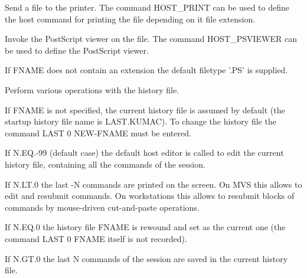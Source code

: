 \ENDCMD


\BEGARG
{}
\ENDARG

   \par
Send a file to the printer.  The command HOST\_PRINT can be used to define 
   the host command for printing the file depending on it file extension.  

\ENDCMD


\BEGARG
{}
\ENDARG

   \par
Invoke the PostScript viewer on the file.  The command HOST\_PSVIEWER can 
   be used to define the PostScript viewer.  

   \par
If FNAME does not contain an extension the default filetype '.PS' is 
   supplied.  

\ENDCMD


\BEGARG
{}
\ENDARG

   \par
Perform various operations with the history file.  

   \par
If FNAME is not specified, the current history file is assumed by default 
   (the startup history file name is LAST.KUMAC).  To change the history file 
   the command LAST 0 NEW-FNAME must be entered.  

   \par
If N.EQ.-99 (default case) the default host editor is called to edit the 
   current history file, containing all the commands of the session.  

   \par
If N.LT.0 the last -N commands are printed on the screen.  On MVS this 
   allows to edit and resubmit commands.  On workstations this allows to 
   resubmit blocks of commands by mouse-driven cut-and-paste operations.  

   \par
If N.EQ.0 the history file FNAME is rewound and set as the current one (the 
   command LAST 0 FNAME itself is not recorded).  

   \par
If N.GT.0 the last N commands of the session are saved in the current 
   history file.  

